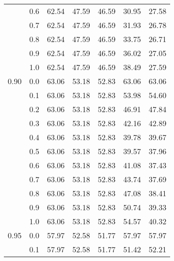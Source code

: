 \begin{longtable}{lp{2cm}|p{2cm}p{2cm}p{2cm}p{2cm}p{2cm}}
     & 0.6 &       62.54 &             47.59 &                46.59 &                30.95 &           27.58 \\
     & 0.7 &       62.54 &             47.59 &                46.59 &                31.93 &           26.78 \\
     & 0.8 &       62.54 &             47.59 &                46.59 &                33.75 &           26.71 \\
     & 0.9 &       62.54 &             47.59 &                46.59 &                36.02 &           27.05 \\
     & 1.0 &       62.54 &             47.59 &                46.59 &                38.49 &           27.59 \\
0.90 & 0.0 &       63.06 &             53.18 &                52.83 &                63.06 &           63.06 \\
     & 0.1 &       63.06 &             53.18 &                52.83 &                53.98 &           54.60 \\
     & 0.2 &       63.06 &             53.18 &                52.83 &                46.91 &           47.84 \\
     & 0.3 &       63.06 &             53.18 &                52.83 &                42.16 &           42.89 \\
     & 0.4 &       63.06 &             53.18 &                52.83 &                39.78 &           39.67 \\
     & 0.5 &       63.06 &             53.18 &                52.83 &                39.57 &           37.96 \\
     & 0.6 &       63.06 &             53.18 &                52.83 &                41.08 &           37.43 \\
     & 0.7 &       63.06 &             53.18 &                52.83 &                43.74 &           37.69 \\
     & 0.8 &       63.06 &             53.18 &                52.83 &                47.08 &           38.41 \\
     & 0.9 &       63.06 &             53.18 &                52.83 &                50.74 &           39.33 \\
     & 1.0 &       63.06 &             53.18 &                52.83 &                54.57 &           40.32 \\
0.95 & 0.0 &       57.97 &             52.58 &                51.77 &                57.97 &           57.97 \\
     & 0.1 &       57.97 &             52.58 &                51.77 &                51.42 &           52.21 \\

\end{longtable}

